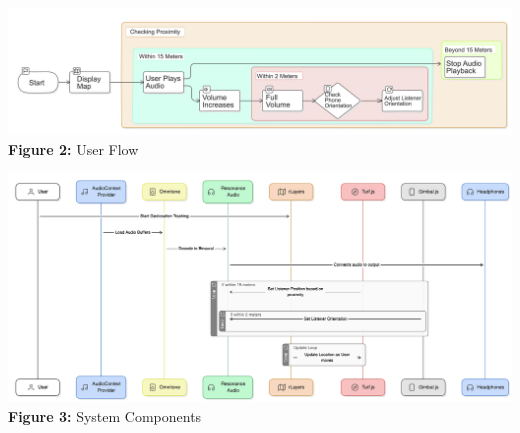 \documentclass[a4paper]{article}
\begin{document}
{\begin{center}
        \vspace{1.2cm}

        \includegraphics[width=\linewidth]{figures/user-flow.png}
        \textbf{Figure 2:} User Flow
        \label{fig:user-flow}

        \vspace{1.2cm}

        \includegraphics[width=\linewidth]{figures/system-components.png}
        \textbf{Figure 3:} System Components
        \label{fig:system-components}

    \end{center}


}


\end{document}
